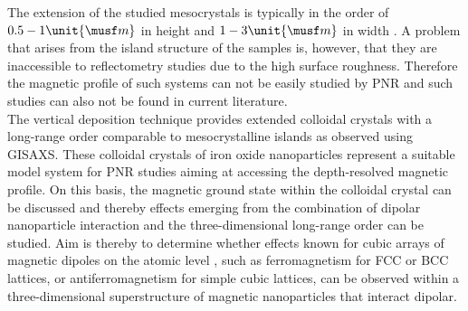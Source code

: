 \documentclass[\main/dresen_thesis.tex]{subfiles}
\begin{document}
  The extension of the studied mesocrystals is typically in the order of $0.5 - 1 \unit{\musf m}$ in height and $1 - 3 \unit{\musf m}$ in width \cite{Wetterskog_2016_Tunin}.
  A problem that arises from the island structure of the samples is, however, that they are inaccessible to reflectometry studies due to the high surface roughness.
  Therefore the magnetic profile of such systems can not be easily studied by PNR and such studies can also not be found in current literature.
  \\

  The vertical deposition technique provides extended colloidal crystals with a long-range order comparable to mesocrystalline islands as observed using GISAXS.
  These colloidal crystals of iron oxide nanoparticles represent a suitable model system for PNR studies aiming at accessing the depth-resolved magnetic profile.
  On this basis, the magnetic ground state within the colloidal crystal can be discussed and thereby effects emerging from the combination of dipolar nanoparticle interaction and the three-dimensional long-range order can be studied.
  Aim is thereby to determine whether effects known for cubic arrays of magnetic dipoles on the atomic level \cite{Luttinger_1946_Theor, Hansen_1998_Model}, such as ferromagnetism for FCC or BCC lattices, or antiferromagnetism for simple cubic lattices, can be observed within a three-dimensional superstructure of magnetic nanoparticles that interact dipolar.
\end{document}
